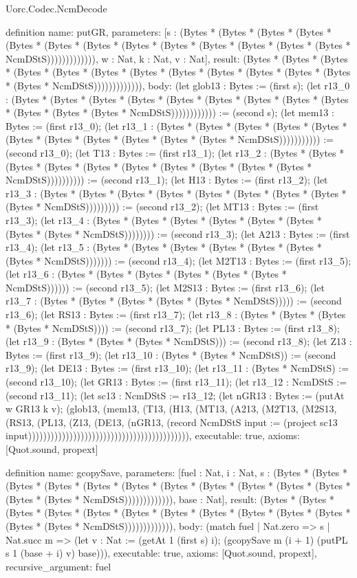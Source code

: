 \begin{lexlean}{Uorc.Codec.NcmDecode}
\begin{semanticmodule}
definition{
  name: putGR,
  parameters: [s : (Bytes * (Bytes * (Bytes * (Bytes * (Bytes * (Bytes * (Bytes * (Bytes * (Bytes * (Bytes * (Bytes * (Bytes * (Bytes * NcmDStS))))))))))))), w : Nat, k : Nat, v : Nat],
  result: (Bytes * (Bytes * (Bytes * (Bytes * (Bytes * (Bytes * (Bytes * (Bytes * (Bytes * (Bytes * (Bytes * (Bytes * (Bytes * NcmDStS))))))))))))),
  body: (let glob13 : Bytes := (first s); (let r13_0 : (Bytes * (Bytes * (Bytes * (Bytes * (Bytes * (Bytes * (Bytes * (Bytes * (Bytes * (Bytes * (Bytes * (Bytes * NcmDStS)))))))))))) := (second s); (let mem13 : Bytes := (first r13_0); (let r13_1 : (Bytes * (Bytes * (Bytes * (Bytes * (Bytes * (Bytes * (Bytes * (Bytes * (Bytes * (Bytes * (Bytes * NcmDStS))))))))))) := (second r13_0); (let T13 : Bytes := (first r13_1); (let r13_2 : (Bytes * (Bytes * (Bytes * (Bytes * (Bytes * (Bytes * (Bytes * (Bytes * (Bytes * (Bytes * NcmDStS)))))))))) := (second r13_1); (let H13 : Bytes := (first r13_2); (let r13_3 : (Bytes * (Bytes * (Bytes * (Bytes * (Bytes * (Bytes * (Bytes * (Bytes * (Bytes * NcmDStS))))))))) := (second r13_2); (let MT13 : Bytes := (first r13_3); (let r13_4 : (Bytes * (Bytes * (Bytes * (Bytes * (Bytes * (Bytes * (Bytes * (Bytes * NcmDStS)))))))) := (second r13_3); (let A213 : Bytes := (first r13_4); (let r13_5 : (Bytes * (Bytes * (Bytes * (Bytes * (Bytes * (Bytes * (Bytes * NcmDStS))))))) := (second r13_4); (let M2T13 : Bytes := (first r13_5); (let r13_6 : (Bytes * (Bytes * (Bytes * (Bytes * (Bytes * (Bytes * NcmDStS)))))) := (second r13_5); (let M2S13 : Bytes := (first r13_6); (let r13_7 : (Bytes * (Bytes * (Bytes * (Bytes * (Bytes * NcmDStS))))) := (second r13_6); (let RS13 : Bytes := (first r13_7); (let r13_8 : (Bytes * (Bytes * (Bytes * (Bytes * NcmDStS)))) := (second r13_7); (let PL13 : Bytes := (first r13_8); (let r13_9 : (Bytes * (Bytes * (Bytes * NcmDStS))) := (second r13_8); (let Z13 : Bytes := (first r13_9); (let r13_10 : (Bytes * (Bytes * NcmDStS)) := (second r13_9); (let DE13 : Bytes := (first r13_10); (let r13_11 : (Bytes * NcmDStS) := (second r13_10); (let GR13 : Bytes := (first r13_11); (let r13_12 : NcmDStS := (second r13_11); (let sc13 : NcmDStS := r13_12; (let nGR13 : Bytes := (putAt w GR13 k v); (glob13, (mem13, (T13, (H13, (MT13, (A213, (M2T13, (M2S13, (RS13, (PL13, (Z13, (DE13, (nGR13, (record NcmDStS {input := (project sc13 input)})))))))))))))))))))))))))))))))))))))))))),
  executable: true,
  axioms: [Quot.sound, propext]
}

definition{
  name: gcopySave,
  parameters: [fuel : Nat, i : Nat, s : (Bytes * (Bytes * (Bytes * (Bytes * (Bytes * (Bytes * (Bytes * (Bytes * (Bytes * (Bytes * (Bytes * (Bytes * (Bytes * NcmDStS))))))))))))), base : Nat],
  result: (Bytes * (Bytes * (Bytes * (Bytes * (Bytes * (Bytes * (Bytes * (Bytes * (Bytes * (Bytes * (Bytes * (Bytes * (Bytes * NcmDStS))))))))))))),
  body: (match fuel
    | Nat.zero => s
    | Nat.succ m => (let v : Nat := (getAt 1 (first s) i); (gcopySave m (i + 1) (putPL s 1 (base + i) v) base))),
  executable: true,
  axioms: [Quot.sound, propext],
  recursive_argument: fuel
}


\end{semanticmodule}
\end{lexlean}
